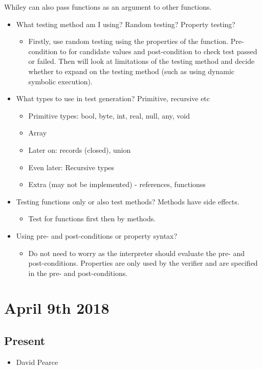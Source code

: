 \documentclass[]{article}
\begin{document}
Whiley can also pass functions as an argument to other functions.
\begin{itemize}
		\item What testing method am I using? Random testing? Property testing?  
		\begin{itemize}
			\item Firstly, use random testing using the properties of the function. Pre-condition to for candidate values and post-condition to check test passed or failed. Then will look at limitations of the testing method and decide whether to expand on the testing method (such as using dynamic symbolic execution).
		\end{itemize}
		\item What types to use in test generation? Primitive, recursive etc
		\begin{itemize}
			\item Primitive types: bool, byte, int, real, null, any, void
			\item Array
			\item Later on: records (closed), union
			\item Even later: Recursive types
			\item Extra (may not be implemented) - references, functionss
		\end{itemize}
		\item Testing functions only or also test methods? Methods have side effects.
		\begin{itemize}
			\item Test for functions first then by methods.
		\end{itemize}
		\item Using pre- and post-conditions or property syntax?
		\begin{itemize}
			\item Do not need to worry as the interpreter should evaluate the pre- and post-conditions. Properties are only used by the verifier and are specified in the pre- and post-conditions.
		\end{itemize}
\end{itemize}

\section{April 9th 2018}
\subsection{Present}
\begin{itemize}
	\item David Pearce
\end{itemize}
\end{document}
